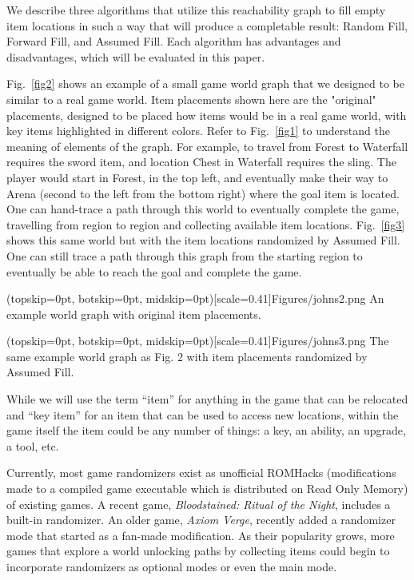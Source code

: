 \documentclass{ieeeaccess}
\begin{document}
We describe three algorithms that utilize this reachability graph to fill empty item locations
in such a way that will produce a completable result: Random Fill, Forward Fill, and Assumed
Fill. Each algorithm has advantages and disadvantages, which will be evaluated in this paper.

Fig.~\ref{fig2} shows an example of a small game world graph that we designed to be similar to a
real game world. Item placements shown here are the "original" placements, designed to be placed
how items would be in a real game world, with key items highlighted in different colors. Refer to
Fig.~\ref{fig1} to understand the meaning of elements of the graph. For example, to travel from 
Forest to Waterfall requires the sword item, and location Chest in Waterfall requires the sling. 
The player would start in Forest, in the top left, and eventually make their way to Arena 
(second to the left from the bottom right) where the goal item is located. One can hand-trace 
a path through this world to eventually complete the game, travelling from region to region and
collecting available item locations. Fig.~\ref{fig3} shows this same world but with the item 
locations randomized by Assumed Fill. One can still trace a path through this graph from the 
starting region to eventually be able to reach the goal and complete the game.

\Figure[t!](topskip=0pt, botskip=0pt, midskip=0pt)[scale=0.41]{Figures/johns2.png}
{An example world graph with original item placements.\label{fig2}}

\Figure[t!](topskip=0pt, botskip=0pt, midskip=0pt)[scale=0.41]{Figures/johns3.png}
{The same example world graph as Fig. 2 with item placements randomized by Assumed
Fill.\label{fig3}}

While we will use the term “item” for anything in the game that can be relocated and “key item”
for an item that can be used to access new locations, within the game itself the item could be
any number of things: a key, an ability, an upgrade, a tool, etc.

Currently, most game randomizers exist as unofficial ROMHacks (modifications made to a 
compiled game executable which is distributed on Read Only Memory) of existing games. 
A recent game, \textit{Bloodstained: Ritual of the Night}, includes a built-in randomizer.
An older game, \textit{Axiom Verge}, recently added a randomizer mode that started 
as a fan-made modification.
As their popularity grows, more games that explore a world unlocking paths by collecting items
could begin to incorporate randomizers as optional modes or even the main mode.
\end{document}
